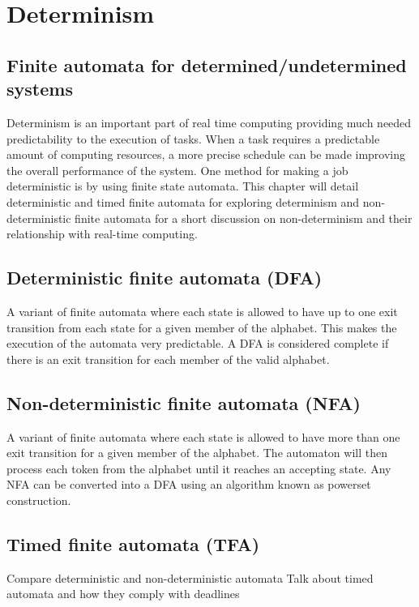 \section{Determinism} \label{sc:determinism}

\subsection{Finite automata for determined/undetermined systems}

Determinism is an important part of real time computing providing much needed predictability to the execution of tasks. When a task requires a predictable amount of computing resources, a more precise schedule can be made improving the overall performance of the system. One method for making a job deterministic is by using finite state automata. This chapter will detail deterministic and timed finite automata for exploring determinism and non-deterministic finite automata for a short discussion on non-determinism and their relationship with real-time computing. \par

\subsection{Deterministic finite automata (DFA)}
A variant of finite automata where each state is allowed to have up to one exit transition from each state for a given member of the alphabet. This makes the execution of the automata very predictable. A DFA is considered complete if there is an exit transition for each member of the valid alphabet. \par

\subsection{Non-deterministic finite automata (NFA)}
A variant of finite automata where each state is allowed to have more than one exit transition for a given member of the alphabet. The automaton will then process each token from the alphabet until it reaches an accepting state. Any NFA can be converted into a DFA using an algorithm known as powerset construction. \par

\subsection{Timed finite automata (TFA)}

Compare deterministic and non-deterministic automata
Talk about timed automata and how they comply with deadlines

